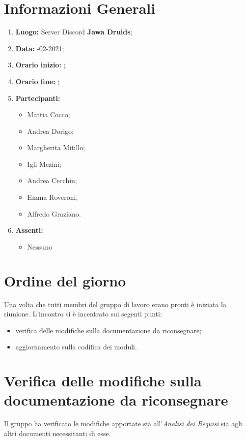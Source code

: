 \newpage
\section{Informazioni Generali}
\begin{enumerate}
  \item \textbf{Luogo:} \normalfont Server Discord \textbf{Jawa Druids};
  \item \textbf{Data:} -02-2021;
  \item \textbf{Orario inizio:} ;
  \item \textbf{Orario fine:} ;
  \item \textbf{Partecipanti:}
  \begin{itemize}
    \item Mattia Cocco;
    \item Andrea Dorigo;
    \item Margherita Mitillo;
    \item Igli Mezini;
    \item Andrea Cecchin;
    \item Emma Roveroni;
    \item Alfredo Graziano.
  \end{itemize}
  \item \textbf{Assenti:}
  \begin{itemize}
    \item Nessuno
  \end{itemize}
\end{enumerate}
\section{Ordine del giorno}
Una volta che tutti membri del gruppo di lavoro erano pronti è iniziata la riunione. L'incontro si è incentrato sui segenti punti:
\begin{itemize}
  \item verifica delle modifiche sulla documentazione da riconsegnare;
  \item aggiornamento sulla codifica dei moduli.
\end{itemize}

\section{Verifica delle modifiche sulla documentazione da riconsegnare}
Il gruppo ha verificato le modifiche apportate sia all'\textit{Analisi dei Requisi} sia agli altri documenti necessitanti di esse.


